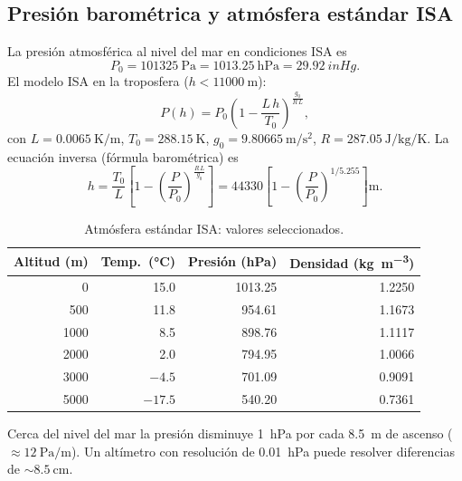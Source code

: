 \documentclass[11pt]{article}
\begin{document}
\subsection{Presión barométrica y atmósfera estándar ISA}
La presión atmosférica al nivel del mar en condiciones ISA es
\begin{equation}
  P_0 = \SI{101325}{\pascal} = \SI{1013.25}{\hecto\pascal} = \SI{29.92}{inHg}.
\end{equation}
El modelo ISA en la troposfera ($h<\SI{11000}{\meter}$):
\begin{equation}
  P(h) = P_0\left(1 - \frac{L\,h}{T_0}\right)^{\frac{g_0}{R\,L}},
\end{equation}
con $L=\SI{0.0065}{\kelvin\per\meter}$, $T_0=\SI{288.15}{\kelvin}$,
$g_0=\SI{9.80665}{\meter\per\second\squared}$,
$R=\SI{287.05}{\joule\per\kilogram\per\kelvin}$. La ecuación inversa (fórmula
barométrica) es
\begin{equation}
  \boxed{\; h = \frac{T_0}{L}\left[1-\left(\frac{P}{P_0}\right)^{\frac{R\,L}{g_0}}\right]
        = \num{44330}\left[1-\left(\frac{P}{P_0}\right)^{1/5.255}\right]\si{\meter}. \;}
  \label{eq:isa}
\end{equation}

\begin{table}[H]\centering
\caption{Atmósfera estándar ISA: valores seleccionados.}
\begin{tabular}{rrrr}
\toprule
Altitud (m) & Temp.\ (\si{\celsius}) & Presión (hPa) & Densidad (\si{\kilogram\per\meter\cubed}) \\
\midrule
0     & 15.0  & 1013.25 & 1.2250 \\
500   & 11.8  & 954.61  & 1.1673 \\
1000  & 8.5   & 898.76  & 1.1117 \\
2000  & 2.0   & 794.95  & 1.0066 \\
3000  & $-4.5$  & 701.09  & 0.9091 \\
5000  & $-17.5$ & 540.20  & 0.7361 \\
\bottomrule
\end{tabular}
\end{table}

\begin{nota}
Cerca del nivel del mar la presión disminuye \SI{1}{\hecto\pascal} por cada
\SI{8.5}{\meter} de ascenso ($\approx\SI{12}{\pascal\per\meter}$). Un altímetro con
resolución de \SI{0.01}{\hecto\pascal} puede resolver diferencias de $\sim\SI{8.5}{\centi\meter}$.
\end{nota}
\end{document}
